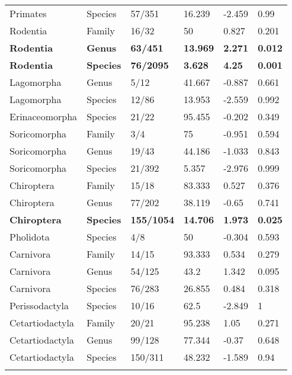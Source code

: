 \begin{longtable}{llllll}
  Primates & Species & 57/351 & 16.239 & -2.459 & 0.99 \\ 
  Rodentia & Family & 16/32 & 50 & 0.827 & 0.201 \\ 
  \textbf{Rodentia} & \textbf{Genus} & \textbf{63/451} & \textbf{13.969} & \textbf{2.271} & \textbf{0.012} \\ 
  \textbf{Rodentia} & \textbf{Species} & \textbf{76/2095} & \textbf{3.628} & \textbf{4.25} & \textbf{0.001} \\ 
  Lagomorpha & Genus & 5/12 & 41.667 & -0.887 & 0.661 \\ 
  Lagomorpha & Species & 12/86 & 13.953 & -2.559 & 0.992 \\ 
  Erinaceomorpha & Species & 21/22 & 95.455 & -0.202 & 0.349 \\ 
  Soricomorpha & Family & 3/4 & 75 & -0.951 & 0.594 \\ 
  Soricomorpha & Genus & 19/43 & 44.186 & -1.033 & 0.843 \\ 
  Soricomorpha & Species & 21/392 & 5.357 & -2.976 & 0.999 \\ 
  Chiroptera & Family & 15/18 & 83.333 & 0.527 & 0.376 \\ 
  Chiroptera & Genus & 77/202 & 38.119 & -0.65 & 0.741 \\ 
  \textbf{Chiroptera} & \textbf{Species} & \textbf{155/1054} & \textbf{14.706} & \textbf{1.973} & \textbf{0.025} \\ 
  Pholidota & Species & 4/8 & 50 & -0.304 & 0.593 \\ 
  Carnivora & Family & 14/15 & 93.333 & 0.534 & 0.279 \\ 
  Carnivora & Genus & 54/125 & 43.2 & 1.342 & 0.095 \\ 
  Carnivora & Species & 76/283 & 26.855 & 0.484 & 0.318 \\ 
  Perissodactyla & Species & 10/16 & 62.5 & -2.849 & 1 \\ 
  Cetartiodactyla & Family & 20/21 & 95.238 & 1.05 & 0.271 \\ 
  Cetartiodactyla & Genus & 99/128 & 77.344 & -0.37 & 0.648 \\ 
  Cetartiodactyla & Species & 150/311 & 48.232 & -1.589 & 0.94 \\ 
   \hline
\hline
\label{Supp_data_structureNTI_threshold1}
\end{longtable}
